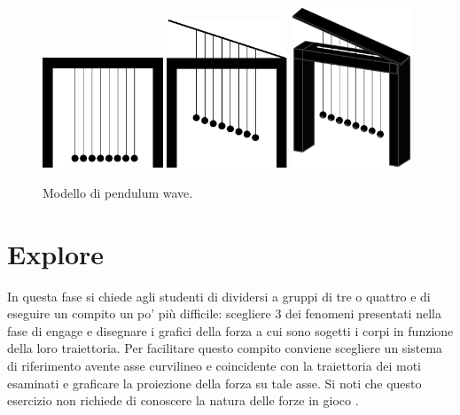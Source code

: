 \documentclass{article}
\begin{document}
\begin{figure}
\centering
  \includegraphics[width=0.32\textwidth]{pendulum_wave3}
  \includegraphics[width=0.32\textwidth]{pendulum_wave2}
  \includegraphics[width=0.32\textwidth]{pendulum_wave1}
  \caption{Modello di pendulum wave.}
  \label{fig:pendulum_wave}
\end{figure}

\section{Explore}
In questa fase si chiede agli studenti di dividersi a gruppi di tre
o quattro e di eseguire un compito un po' più difficile: scegliere
3 dei fenomeni presentati nella fase di engage e disegnare i
grafici della forza a cui sono sogetti i corpi in funzione della
loro traiettoria. Per facilitare questo compito conviene
scegliere un sistema di riferimento avente asse curvilineo
e coincidente con la traiettoria dei moti esaminati e graficare
la proiezione della forza su tale asse. Si noti che questo
esercizio non richiede di conoscere la natura delle forze in
gioco \cite{barbieri2015good}.
\end{document}
